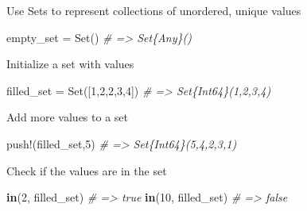 \documentclass[ignorenonframetext,]{beamer}
\newenvironment{Shaded}{}{}
\newcommand{\KeywordTok}[1]{\textcolor[rgb]{0.00,0.44,0.13}{\textbf{{#1}}}}
\newcommand{\DataTypeTok}[1]{\textcolor[rgb]{0.56,0.13,0.00}{{#1}}}
\newcommand{\FloatTok}[1]{\textcolor[rgb]{0.25,0.63,0.44}{{#1}}}
\newcommand{\CommentTok}[1]{\textcolor[rgb]{0.38,0.63,0.69}{\textit{{#1}}}}
\newcommand{\NormalTok}[1]{{#1}}
\begin{document}
\begin{frame}[fragile]{Use Sets to represent collections of unordered,
unique values}

\begin{Shaded}
\begin{Highlighting}[]
\NormalTok{empty_set = }\DataTypeTok{Set}\NormalTok{() }\CommentTok{# => Set\{Any\}()}
\end{Highlighting}
\end{Shaded}

\end{frame}

\begin{frame}[fragile]{Initialize a set with values}

\begin{Shaded}
\begin{Highlighting}[]
\NormalTok{filled_set = }\DataTypeTok{Set}\NormalTok{([}\FloatTok{1}\NormalTok{,}\FloatTok{2}\NormalTok{,}\FloatTok{2}\NormalTok{,}\FloatTok{3}\NormalTok{,}\FloatTok{4}\NormalTok{]) }\CommentTok{# => Set\{Int64\}(1,2,3,4)}
\end{Highlighting}
\end{Shaded}

\end{frame}

\begin{frame}[fragile]{Add more values to a set}

\begin{Shaded}
\begin{Highlighting}[]
\NormalTok{push!(filled_set,}\FloatTok{5}\NormalTok{) }\CommentTok{# => Set\{Int64\}(5,4,2,3,1)}
\end{Highlighting}
\end{Shaded}

\end{frame}

\begin{frame}[fragile]{Check if the values are in the set}

\begin{Shaded}
\begin{Highlighting}[]
\KeywordTok{in}\NormalTok{(}\FloatTok{2}\NormalTok{, filled_set) }\CommentTok{# => true}
\KeywordTok{in}\NormalTok{(}\FloatTok{10}\NormalTok{, filled_set) }\CommentTok{# => false}
\end{Highlighting}
\end{Shaded}

\end{frame}
\end{document}
